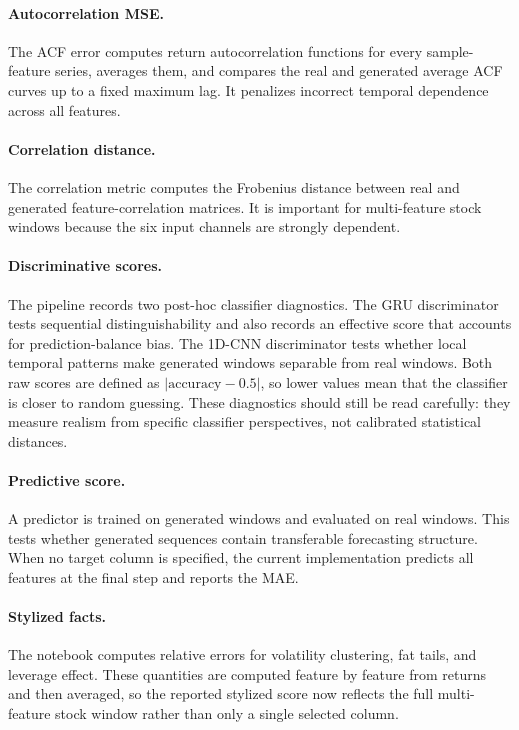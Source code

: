 \documentclass[11pt,a4paper]{article}
\begin{document}
\paragraph{Autocorrelation MSE.}
The ACF error computes return autocorrelation functions for every
sample-feature series, averages them, and compares the real and generated
average ACF curves up to a fixed maximum lag. It penalizes incorrect temporal
dependence across all features.

\paragraph{Correlation distance.}
The correlation metric computes the Frobenius distance between real and
generated feature-correlation matrices. It is important for multi-feature stock
windows because the six input channels are strongly dependent.

\paragraph{Discriminative scores.}
The pipeline records two post-hoc classifier diagnostics. The GRU
discriminator tests sequential distinguishability and also records an
effective score that accounts for prediction-balance bias. The 1D-CNN
discriminator tests whether local temporal patterns make generated windows
separable from real windows. Both raw scores are defined as
\(|\mathrm{accuracy}-0.5|\), so lower values mean that the classifier is closer
to random guessing. These diagnostics should still be read carefully: they
measure realism from specific classifier perspectives, not calibrated
statistical distances.

\paragraph{Predictive score.}
A predictor is trained on generated windows and evaluated on real windows. This
tests whether generated sequences contain transferable forecasting structure.
When no target column is specified, the current implementation predicts all
features at the final step and reports the MAE.

\paragraph{Stylized facts.}
The notebook computes relative errors for volatility clustering, fat tails, and
leverage effect. These quantities are computed feature by feature from returns
and then averaged, so the reported stylized score now reflects the full
multi-feature stock window rather than only a single selected column.
\end{document}
